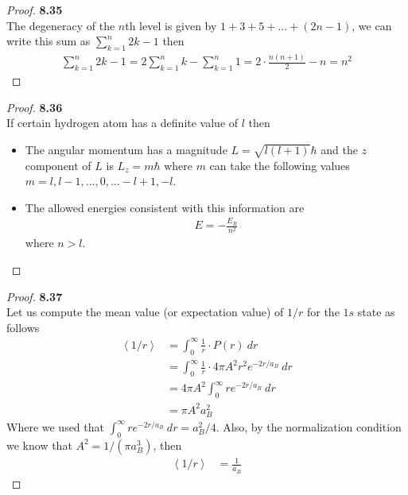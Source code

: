 \documentclass[11pt]{article}
\newcommand{\expect}[1]{\left\langle {#1} \right\rangle}
\theoremstyle{definition}
\begin{document}
\cleardoublepage
\begin{proof}{\textbf{8.35}}\\
The degeneracy of the $n$th level is given by $1 + 3 + 5 +...+ (2n - 1)$, we 
can write this sum as $\sum_{k=1}^n 2k -1$ then
\begin{align*}
    \sum_{k=1}^n 2k -1 = 2\sum_{k=1}^n k - \sum_{k=1}^n1
    = 2\cdot\frac{n(n+1)}{2} - n
    = n^2
\end{align*}
\end{proof}
\begin{proof}{\textbf{8.36}}\\
If certain hydrogen atom has a definite value of $l$ then
\begin{itemize}
\item [\textbf{(a)}] The angular momentum has a magnitude
$L = \sqrt{l(l+1)}\hbar$ and the $z$ component of $L$ is $L_z = m\hbar$ where
$m$ can take the following values $m = l, l-1, ..., 0, ... -l+1, -l$.
\item [\textbf{(b)}] The allowed energies consistent with this information are
\begin{align*}
    E = -\frac{E_R}{n^2}
\end{align*}
where $n > l$.
\end{itemize}
\end{proof}

\cleardoublepage
\begin{proof}{\textbf{8.37}}\\
Let us compute the mean value (or expectation value) of $1/r$ for the $1s$
state as follows
\begin{align*}
    \expect{1/r} &= \int_0^\infty \frac{1}{r}\cdot P(r)~dr\\
    &= \int_0^\infty \frac{1}{r}\cdot 4\pi A^2 r^2e^{-2r/a_B} ~dr\\
    &= 4\pi A^2 \int_0^\infty re^{-2r/a_B} ~dr\\
    &= \pi A^2 a_B^2
\end{align*}
Where we used that $\int_0^\infty re^{-2r/a_B}~dr = a_B^2/4$.
Also, by the normalization condition we know that $A^2 = 1/(\pi a_B^3)$,
then
\begin{align*}
    \expect{1/r} &= \frac{1}{a_B}
\end{align*}
\end{proof}
\end{document}

